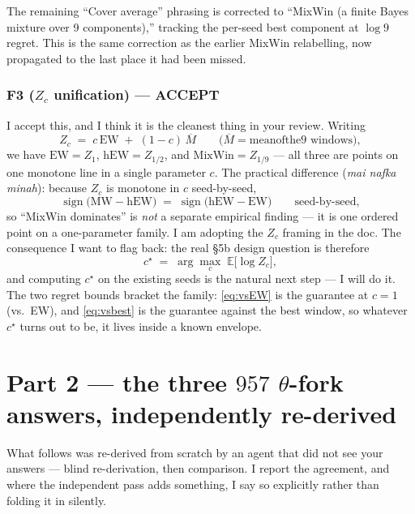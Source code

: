 \documentclass[11pt,a4paper]{article}
\begin{document}
\noindent The remaining ``Cover average'' phrasing is corrected to
``MixWin (a finite Bayes mixture over 9 components),'' tracking the per-seed best
component at $\log 9$ regret. This is the same correction as the earlier
MixWin relabelling, now propagated to the last place it had been missed.

\section*{F3 ($Z_c$ unification) --- ACCEPT}

\noindent I accept this, and I think it is the cleanest thing in your review.
Writing
\[
  Z_c \;=\; c\,\mathrm{EW} \;+\; (1-c)\,\overline{M}
  \qquad \big(\overline{M} = \mathrm{mean of the } 9 \text{ windows}\big),
\]
we have $\mathrm{EW} = Z_1$, $\mathrm{hEW} = Z_{1/2}$, and
$\mathrm{MixWin} = Z_{1/9}$ --- all three are points on one monotone line in a
single parameter $c$. The practical difference (\emph{mai nafka minah}): because
$Z_c$ is monotone in $c$ seed-by-seed,
\[
  \operatorname{sign}\!\big(\mathrm{MW} - \mathrm{hEW}\big)
  \;=\; \operatorname{sign}\!\big(\mathrm{hEW} - \mathrm{EW}\big)
  \qquad \text{seed-by-seed},
\]
so ``MixWin dominates'' is \emph{not} a separate empirical finding --- it is one
ordered point on a one-parameter family. I am adopting the $Z_c$ framing in the
doc. The consequence I want to flag back: the real \S5b design question is
therefore
\[
  c^\star \;=\; \arg\max_c \; \mathbb{E}\big[\log Z_c\big],
\]
and computing $c^\star$ on the existing seeds is the natural next step --- I will
do it. The two regret bounds bracket the family: \eqref{eq:vsEW} is the guarantee
at $c = 1$ (vs.\ EW), and \eqref{eq:vsbest} is the guarantee against the best
window, so whatever $c^\star$ turns out to be, it lives inside a known envelope.

\part*{Part 2 --- the three $957$ $\theta$-fork answers,
  independently re-derived}

\noindent What follows was re-derived from scratch by an agent that did not see
your answers --- blind re-derivation, then comparison. I report the agreement,
and where the independent pass adds something, I say so explicitly rather than
folding it in silently.
\end{document}
